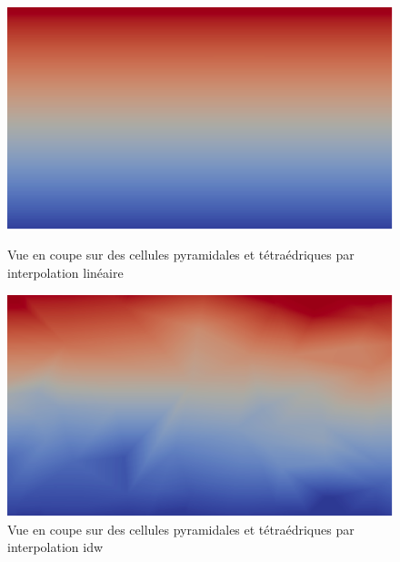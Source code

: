 \begin{figure}[H]
    \centering
    \begin{minipage}[t]{0.48\textwidth}
        \centering
        \includegraphics[width=\textwidth]{images/lin_pyr_tet2.png}
        \caption{Vue en coupe sur des cellules pyramidales et tétraédriques par interpolation linéaire}
        \label{fig:lin_pyr_tet}
    \end{minipage}%
    \hfill
    \begin{minipage}[t]{0.48\textwidth}
        \centering
        \includegraphics[width=\textwidth]{images/idw_pyr_tet2.png}
        \caption{Vue en coupe sur des cellules pyramidales et tétraédriques par interpolation idw}
        \label{fig:idw_pyr_tet}
    \end{minipage}
\end{figure}



